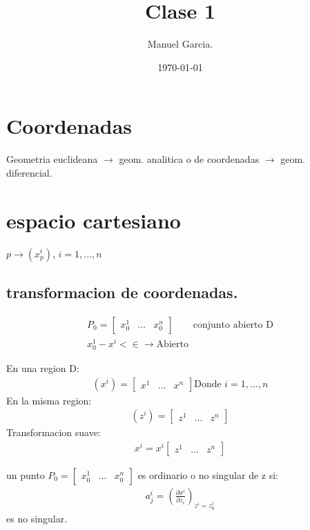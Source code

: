 \documentclass{article}
\title{Clase 1 }
\author{Manuel Garcia.}
\date{\today}
\newcommand{\caja}[3]{%
  \begin{tcolorbox}[colback=#1!5!white,colframe=#1!25!black,title=#2]
    #3
  \end{tcolorbox}%
}
\begin{document}
\maketitle

\section{Coordenadas}
Geometria euclideana $ \rightarrow $ geom. analitica o de coordenadas $ \rightarrow  $ geom. diferencial.

\section{espacio cartesiano }
$ p \rightarrow (x^i_p)  $, $ i=1,...,n $
\subsection{transformacion de coordenadas. } %
\begin{gather}
P_0 = \begin{bmatrix} x_0^1  & ...  & x_0^n  \end{bmatrix} \qquad \text{conjunto abierto D}\\
  x_0^1-x^i<\in \rightarrow  \text{Abierto }  
  \label{eq:transf-coordenadas }
\end{gather}

En una region D:
\begin{gather}
  (x^i) = \begin{bmatrix} x^1  & ...  & x^n \end{bmatrix} \text{Donde }i = 1,...,n 
\end{gather}
En la misma region: 
\begin{gather}
  (z^i)= \begin{bmatrix} z^1  & ...  & z^n \end{bmatrix}
\end{gather}
Transformacion suave:
\begin{gather}
  x^i = x^i\begin{bmatrix} z^1  & ...  & z^n \end{bmatrix}
\end{gather}
\caja{green}{Def. }{
  un punto $ P_0 = \begin{bmatrix} x_0^1  & ...  & x_0^n  \end{bmatrix}  $ es ordinario o no singular de z si:
  \begin{gather}
a_j^i = ( \frac{\partial x^i  }{\partial z_i} ) _{z^i=z_0^i} 
  \end{gather}
  es no singular. 
}
\end{document}
